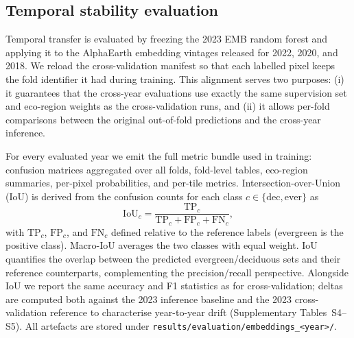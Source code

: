 \documentclass[utf8]{FrontiersinHarvard}
\begin{document}
\subsection{Temporal stability evaluation}
Temporal transfer is evaluated by freezing the 2023 EMB random forest and applying it to the AlphaEarth embedding vintages released for 2022, 2020, and 2018. We reload the cross-validation manifest so that each labelled pixel keeps the fold identifier it had during training. This alignment serves two purposes: (i) it guarantees that the cross-year evaluations use exactly the same supervision set and eco-region weights as the cross-validation runs, and (ii) it allows per-fold comparisons between the original out-of-fold predictions and the cross-year inference.

For every evaluated year we emit the full metric bundle used in training: confusion matrices aggregated over all folds, fold-level tables, eco-region summaries, per-pixel probabilities, and per-tile metrics. Intersection-over-Union (IoU) is derived from the confusion counts for each class \(c \in \{\text{dec}, \text{ever}\}\) as
\begin{equation*}
    \mathrm{IoU}_c = \frac{\mathrm{TP}_c}{\mathrm{TP}_c + \mathrm{FP}_c + \mathrm{FN}_c},
\end{equation*}
with \(\mathrm{TP}_c\), \(\mathrm{FP}_c\), and \(\mathrm{FN}_c\) defined relative to the reference labels (evergreen is the positive class). Macro-IoU averages the two classes with equal weight. IoU quantifies the overlap between the predicted evergreen/deciduous sets and their reference counterparts, complementing the precision/recall perspective. Alongside IoU we report the same accuracy and F1 statistics as for cross-validation; deltas are computed both against the 2023 inference baseline and the 2023 cross-validation reference to characterise year-to-year drift (Supplementary Tables~S4–S5). All artefacts are stored under \texttt{results/evaluation/embeddings\_<year>/}.
\end{document}
